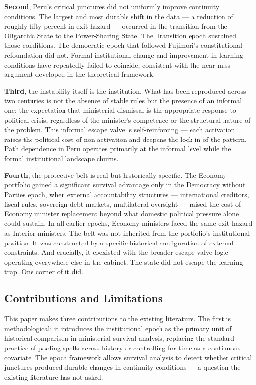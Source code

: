 \documentclass[doc, 12pt, a4paper,floatsintext]{apa7}
\begin{document}
\textbf{Second}, Peru's critical junctures did not uniformly 
improve continuity conditions. The largest and most durable shift 
in the data --- a reduction of roughly fifty percent in exit 
hazard --- occurred in the transition from the Oligarchic State 
to the Power-Sharing State. The Transition epoch sustained those 
conditions. The democratic epoch that followed Fujimori's 
constitutional refoundation did not. Formal institutional change 
and improvement in learning conditions have repeatedly failed 
to coincide, consistent with the near-miss argument developed 
in the theoretical framework.

\textbf{Third}, the instability itself is the institution. What 
has been reproduced across two centuries is not the absence of 
stable rules but the presence of an informal one: the expectation 
that ministerial dismissal is the appropriate response to political 
crisis, regardless of the minister's competence or the structural 
nature of the problem. This informal escape valve is self-reinforcing 
--- each activation raises the political cost of non-activation 
and deepens the lock-in of the pattern. Path dependence in Peru 
operates primarily at the informal level while the formal 
institutional landscape churns.

\textbf{Fourth}, the protective belt is real but historically 
specific. The Economy portfolio gained a significant survival 
advantage only in the Democracy without Parties epoch, when 
external accountability structures --- international creditors, 
fiscal rules, sovereign debt markets, multilateral oversight --- 
raised the cost of Economy minister replacement beyond what 
domestic political pressure alone could sustain. In all earlier 
epochs, Economy ministers faced the same exit hazard as Interior 
ministers. The belt was not inherited from the portfolio's 
institutional position. It was constructed by a specific 
historical configuration of external constraints. And crucially, 
it coexisted with the broader escape valve logic operating 
everywhere else in the cabinet. The state did not escape the 
learning trap. One corner of it did.

\subsection{Contributions and Limitations}

This paper makes three contributions to the existing literature. 
The first is methodological: it introduces the institutional 
epoch as the primary unit of historical comparison in ministerial 
survival analysis, replacing the standard practice of pooling 
spells across history or controlling for time as a continuous 
covariate. The epoch framework allows survival analysis to detect 
whether critical junctures produced durable changes in continuity 
conditions --- a question the existing literature has not asked.
\end{document}
